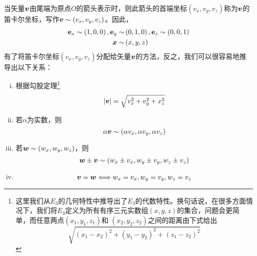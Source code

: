 当矢量$\boldsymbol{v}$由尾端为原点$O$的箭头表示时，则此箭头的首端坐标$(v_x,v_y,v_z)$称为$\boldsymbol{v}$的笛卡尔坐标，写作$\boldsymbol{v}\sim (v_x,v_y,v_z)$。因此，
\begin{align}
	\mathbf{e}_x\sim \left( 1,0,0 \right) ,\mathbf{e}_y\sim &\left( 0,1,0 \right) ,\mathbf{e}_z\sim \left( 0,0,1 \right)\label{equ:1.2}\\
	\boldsymbol{x}\sim &\left( x,y,z \right)\label{equ:1.3}
\end{align}
有了将笛卡尔坐标$(v_x,v_y,v_z)$分配给矢量$\boldsymbol{v}$的方法，反之，我们可以很容易地推导出以下关系：
\begin{enumerate}[(i)]
    \item 根据勾股定理\footnote{这里我们从$E_3$的几何特性中推导出了$E_3$的代数特性。换句话说，在很多方面情况下，我们将$E_3$定义为所有有序三元实数组$(x,y,z)$的集合，问题会更简单，而任意两点$(x_1,y_1,z_1)$和 $(x_2,y_2,z_2)$之间的距离由下式给出
    \begin{equation*}
        \sqrt{\left( x_1-x_2 \right) ^2+\left( y_1-y_2 \right) ^2+\left( z_1-z_2 \right) ^2}
    \end{equation*}
    }
    \begin{equation}\label{equ:1.4}
        \left| \boldsymbol{v} \right|=\sqrt{v_{x}^{2}+v_{y}^{2}+x_{z}^{2}}
    \end{equation}
    \item 若$\alpha$为实数，则
    \begin{equation}\label{equ:1.5}
        \alpha \boldsymbol{v}\sim (\alpha v_x,\alpha v_y,\alpha v_z)
    \end{equation}
    \item 若$\boldsymbol{w}\sim \left( w_x,w_y,w_z \right) $，则
    \begin{equation}\label{equ:1.6}
        \boldsymbol{w}\pm \boldsymbol{v}\sim (w_x\pm v_x,w_y\pm v_y,w_z\pm v_z)
    \end{equation}
    \item 
    \begin{equation}\label{equ:1.7}
        \boldsymbol{v}=\boldsymbol{w}\Longleftrightarrow w_x=v_x,w_y=v_y,w_z=v_z
    \end{equation}
\end{enumerate}